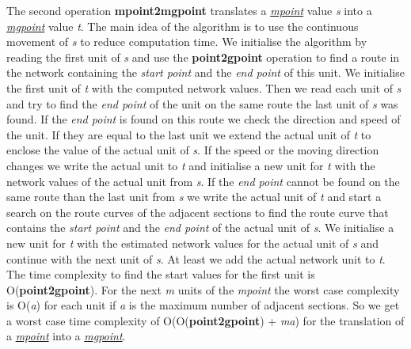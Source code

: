 \documentclass[a4paper]{article}
\newcommand{\op}[1]{\textbf{#1}}
\newcommand{\var}[1]{\textsl{#1}}
\newcommand{\dt}[1]{\textsl{\underline{#1}}}
\begin{document}
{The second operation \op{mpoint2mgpoint} translates a \dt{mpoint} value \var{s} into a \dt{mgpoint} value \var{t}. The main idea of the algorithm is to use the continuous movement of \var{s} to reduce computation time. We initialise the algorithm by reading the first unit of \var{s} and use the \op{point2gpoint} operation to find a route in the network containing the \var{start point} and the \var{end point} of this unit. We initialise the first unit of \var{t} with the computed network values. Then we read each unit of \var{s} and try to find the \var{end point} of the unit on the same route the last unit of \var{s} was found. If the \var{end point} is found on this route we check the direction and speed of the unit. If they are equal to the last unit we extend the actual unit of \var{t} to enclose the value of the actual unit of \var{s}. If the speed or the moving direction changes we write the actual unit to \var{t} and initialise a new unit for \var{t} with the network values of the actual unit from \var{s}. If the \var{end point} cannot be found on the same route than the last unit from \var{s} we write the actual unit of \var{t} and start a search on the route curves of the adjacent sections to find the route curve that contains the \var{start point} and the \var{end point} of the actual unit of \var{s}. We initialise a new unit for \var{t} with the estimated network values for the actual unit of \var{s} and continue with the next unit of \var{s}. At least we add the actual network unit to \var{t}. The time complexity to find the start values for the first unit is O(\op{point2gpoint}). For the next \var{m} units of the \var{mpoint} the worst case complexity is O(\var{a}) for each unit if \var{a} is the maximum number of adjacent sections. So we get a worst case time complexity of O(O(\op{point2gpoint}) + \var{ma}) for the translation of a \dt{mpoint} into a \dt{mgpoint}.

}
\end{document}
